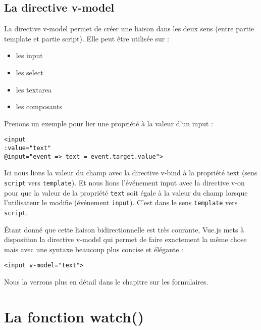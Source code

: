 \subsection{La directive v-model}
La directive {\color{monOrange}v-model} permet de créer une liaison dans les deux sens (entre partie {\color{blue} template} et partie {\color{blue} script}). Elle peut être utilisée sur :
\begin{itemize}
\item les {\color{monOrange} input}
\item les {\color{monOrange} select}
\item les {\color{monOrange} textarea}
\item les composants
\end{itemize}

Prenons un exemple pour lier une propriété à la valeur d'un input :
\begin{verbatim}
<input
:value="text"
@input="event => text = event.target.value">
\end{verbatim}
Ici nous lions la valeur du champ avec la directive {\color{monOrange}v-bind} à la propriété {\color{monOrange}text } (sens {\tt script} vers {\tt template}). Et nous lions l'événement {\color{monOrange}input} avec la directive {\color{monOrange}v-on} pour que la valeur de la propriété {\tt text} soit égale à la valeur du champ lorsque l'utilisateur le modifie (événement {\tt input}). C'est dans le sens {\tt template} vers {\tt script}.

Étant donné que cette liaison bidirectionnelle est très courante, {\color{monOrange}Vue.js} mets à disposition la directive {\color{monOrange}v-model} qui permet de faire exactement la même chose mais avec une syntaxe beaucoup plus concise et élégante :
\begin{verbatim}
<input v-model="text">
\end{verbatim}

Nous la verrons plus en détail dans le chapitre sur les formulaires.



\section{La fonction watch()}
